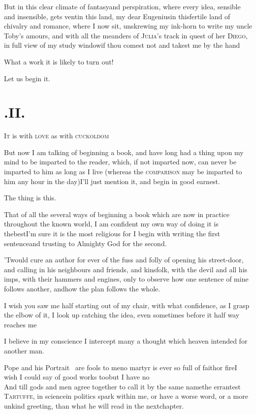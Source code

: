 \documentclass{article}
\begin{document}
But in this clear climate of fantasy\break and perspiration, where
every idea,
sensible and insensible, gets vent\tsk in this land,
my dear Eugenius\tsk in this\break fertile land of chivalry and
romance, where I now sit, unskrewing my ink-horn to write my uncle
Toby’s amours, and with all the meanders of
\textsc{Julia}’s track in quest of her
\textsc{Diego}, in full view of my study window\tsk if thou
comest not and takest me by the hand\tsh

What a work it is likely to turn out!

Let us begin it.




\vfill{}\eject
\section{.\enspace II.}

\lettrine{I}{t} is with \textsc{love} as
with \textsc{cuck}\textsc{oldom}\tsh

\bigskip
\tsh But now I am talking of beginning a book, and have long had a
thing upon my mind to be imparted to the reader, which, if not
imparted now, can never be imparted to him as long as I live
(whereas the \textsc{comparison} may be imparted to him any
hour in the day)\tsh I’ll just mention it, and begin
in good earnest.

The thing is this.

That of all the several ways of beginning a book which are now
in practice throughout the known world, I am confident my own way
of doing it is the\break best\tsh I’m sure it is the most
religious \hbox{}\tsh for I begin with writing the first
sentence\tsh and trusting to Almighty God for the
second.

’Twould cure an author for ever of\break
the fuss and folly of opening his street-door,
and calling in his neighbours and friends, and kinsfolk, with the devil and all his
imps, with their hammers and engines, \etc only to observe how one sentence of mine
follows another, and\break how the plan follows the whole.

I wish you saw me half starting out of my chair, with what confidence, as I grasp
the elbow of it, I look up\tsh{} catching the idea, even sometimes before it half way
reaches me\tsh

I believe in my conscience I intercept many a thought which
heaven intended for another man.


Pope and his Portrait \fnast\  are fools to\break
me\tsh no martyr is ever so full of faith\break or
fire\tsh I wish I could say of good works too\tsh but I have
no\\
\break
And till gods and men agree together to call it by the same
name\tsh the errantest \textsc{Tartuffe}, in science\tsk in
politics\break
{}
spark within
me, or have a worse word, or a more unkind greeting,\break
{}\break
{}
\eject
\noindent
than what he will read in the next\break chapter.
\end{document}
